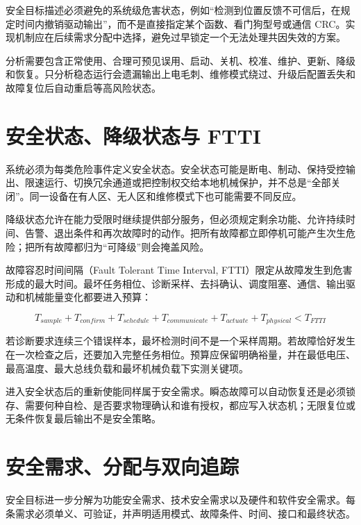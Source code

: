 安全目标描述必须避免的系统级危害状态，例如“检测到位置反馈不可信后，在规定时间内撤销驱动输出”，而不是直接指定某个函数、看门狗型号或通信 CRC。实现机制应在后续需求分配中选择，避免过早锁定一个无法处理共因失效的方案。

分析需要包含正常使用、合理可预见误用、启动、关机、校准、维护、更新、降级和恢复。只分析稳态运行会遗漏输出上电毛刺、维修模式绕过、升级后配置丢失和故障复位后自动重启等高风险状态。

\section{安全状态、降级状态与 FTTI}

系统必须为每类危险事件定义安全状态。安全状态可能是断电、制动、保持受控输出、限速运行、切换冗余通道或把控制权交给本地机械保护，并不总是“全部关闭”。同一设备在有人区、无人区和维修模式下也可能需要不同反应。

降级状态允许在能力受限时继续提供部分服务，但必须规定剩余功能、允许持续时间、告警、退出条件和再次故障时的动作。把所有故障都立即停机可能产生次生危险；把所有故障都归为“可降级”则会掩盖风险。

故障容忍时间间隔（Fault Tolerant Time Interval, FTTI）限定从故障发生到危害形成的最大时间。最坏任务相位、诊断采样、去抖确认、调度阻塞、通信、输出驱动和机械能量变化都要进入预算：

\begin{equation}
  T_{sample}+T_{confirm}+T_{schedule}+T_{communicate}
  +T_{actuate}+T_{physical}<T_{FTTI}
\end{equation}

若诊断要求连续三个错误样本，最坏检测时间不是一个采样周期。若故障恰好发生在一次检查之后，还要加入完整任务相位。预算应保留明确裕量，并在最低电压、最高温度、最大总线负载和最坏机械负载下实测关键项。

进入安全状态后的重新使能同样属于安全需求。瞬态故障可以自动恢复还是必须锁存、需要何种自检、是否要求物理确认和谁有授权，都应写入状态机；无限复位或无条件恢复最后输出不是安全策略。

\section{安全需求、分配与双向追踪}

安全目标进一步分解为功能安全需求、技术安全需求以及硬件和软件安全需求。每条需求必须单义、可验证，并声明适用模式、故障条件、时间、接口和最终状态。

